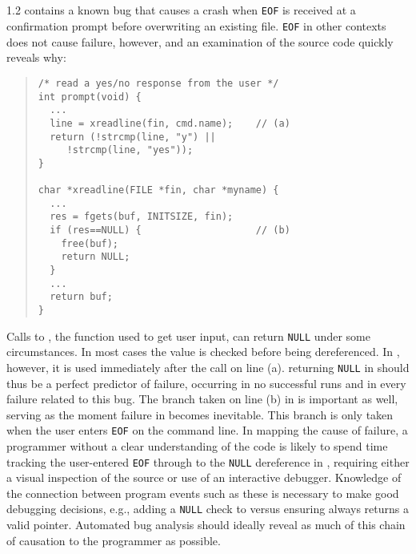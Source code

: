 
\subsection{\large\textbf{}}
\label{sec-ccrypt}
 1.2 contains a known bug that causes a crash when \texttt{EOF} is received at a confirmation prompt before overwriting an existing file.  \texttt{EOF} in other contexts does not cause failure, however, and an examination of the source code quickly reveals why:
\begin{quote}
\small
\begin{verbatim}
/* read a yes/no response from the user */
int prompt(void) {
  ...
  line = xreadline(fin, cmd.name);    // (a)
  return (!strcmp(line, "y") ||
     !strcmp(line, "yes"));
}

char *xreadline(FILE *fin, char *myname) {
  ...
  res = fgets(buf, INITSIZE, fin);
  if (res==NULL) {                    // (b)
    free(buf);
    return NULL;
  }
  ...
  return buf;
}
\end{verbatim}
\end{quote}

Calls to , the function used to get user input, can return \texttt{NULL} under some circumstances.  In most cases the value is checked before being dereferenced.  In , however, it is used immediately after the call on line (a).   returning \texttt{NULL} in  should thus be a perfect predictor of failure, occurring in no successful runs and in every failure related to this bug.  The branch taken on line (b) in  is important as well, serving as the moment failure in  becomes inevitable.  This branch is only taken when the user enters \texttt{EOF} on the command line.  In mapping the cause of failure, a programmer without a clear understanding of the code is likely to spend time tracking the user-entered \texttt{EOF} through  to the \texttt{NULL} dereference in , requiring either a visual inspection of the source or use of an interactive debugger.  Knowledge of the connection between program events such as these is necessary to make good debugging decisions, e.g., adding a \texttt{NULL} check to  versus ensuring  always returns a valid pointer.  Automated bug analysis should ideally reveal as much of this chain of causation to the programmer as possible.

